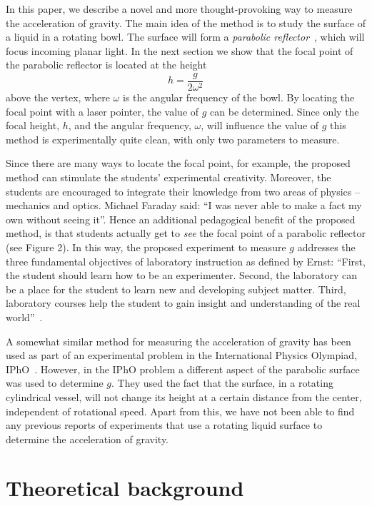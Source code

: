 \documentclass[11pt, a4paper, twocolumn, swedish, english]{article}
\begin{document}
In this paper, we describe a novel and more thought-provoking way to
measure the acceleration of gravity. The main idea of the method is to
study the surface of a liquid in a rotating bowl. The surface will
form a \emph{parabolic reflector}~\cite{Berg1990}, which will focus
incoming planar light. In the next section we show that the focal
point of the parabolic reflector is located at the height
\begin{equation}
h=\frac{g}{2\omega^2}
\end{equation}
above the vertex, where $\omega$ is the angular
frequency of the bowl. By locating the focal point with a laser pointer, the value of $g$ can be determined.
Since only the focal height, $h$, and the angular
frequency, $\omega$, will influence the value of $g$ this method
is experimentally quite clean, with only two parameters to measure. 

Since there are many ways to locate the focal point, for example, 
the proposed method can stimulate the students' experimental creativity.
Moreover, the students are encouraged to integrate their knowledge 
from two areas of physics -- mechanics and optics. Michael Faraday 
said: ``I was never able to make a fact my own without seeing it''.
Hence an additional pedagogical benefit of the proposed method, is that students
actually get to \emph{see} the focal point of a parabolic reflector (see Figure 2).
In this way, the proposed experiment to measure $g$ addresses the three fundamental objectives
of laboratory instruction as defined by Ernst:
``First, the student should learn how to be an experimenter.
Second, the laboratory can be a place for the student
to learn new and developing subject matter. Third, laboratory
courses help the student to gain insight and understanding of
the real world''~\cite{Ernst1983}.

A somewhat similar method for measuring the acceleration of gravity has been used as part of an experimental
problem in the International Physics Olympiad,
IPhO~\cite{IPhO2001}. However, in the IPhO problem a
different aspect of the parabolic surface was used
to determine $g$. They used the fact that the surface, in a rotating cylindrical vessel, will not change its height at a certain distance from the center, independent of rotational speed. Apart from this, we have not been able to find any previous reports of experiments that use a rotating liquid surface to
determine the acceleration of gravity.

\section{Theoretical background}
\end{document}
